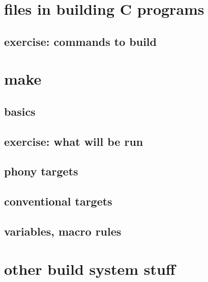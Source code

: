 
\section{files in building C programs}



\subsection{exercise: commands to build}



\section{make}

\subsection{basics}



\subsection{exercise: what will be run}



\subsection{phony targets}



\subsection{conventional targets}



\subsection{variables, macro rules}



\section{other build system stuff}




